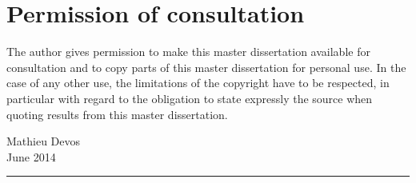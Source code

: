 \chapter*{Permission of consultation}

The author gives permission to make this master dissertation available for consultation and to copy parts of this master dissertation for personal use. In the case of any other use, the limitations of the copyright have to be respected, in particular with regard to the obligation to state expressly the source when quoting results from this master dissertation.

\vfill

\begin{flushright}
	Mathieu Devos
	\\
	June 2014 \\
	\rule{90pt}{0.4pt}
\end{flushright}